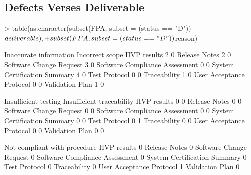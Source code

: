 \documentclass{article}
\begin{document}
\subsection{Defects Verses Deliverable}

\begin{Schunk}
\begin{Sinput}
> table(as.character(subset(FPA, subset = (status == "D"))$deliverable),
+       subset(FPA, subset = (status == "D"))$reason)
\end{Sinput}
\begin{Soutput}
                                 Inaccurate information Incorrect scope
  IIVP results                                        2               0
  Release Notes                                       2               0
  Software Change Request                             3               0
  Software Compliance Assessment                      0               0
  System Certification Summary                        4               0
  Test Protocol                                       0               0
  Traceability                                        1               0
  User Acceptance Protocol                            0               0
  Validation Plan                                     1               0
                                
                                 Insufficient testing Insufficient traceability
  IIVP results                                      0                         0
  Release Notes                                     0                         0
  Software Change Request                           0                         0
  Software Compliance Assessment                    0                         0
  System Certification Summary                      0                         0
  Test Protocol                                     0                         1
  Traceability                                      0                         0
  User Acceptance Protocol                          0                         0
  Validation Plan                                   0                         0
                                
                                 Not compliant with procedure
  IIVP results                                              0
  Release Notes                                             0
  Software Change Request                                   0
  Software Compliance Assessment                            0
  System Certification Summary                              0
  Test Protocol                                             0
  Traceability                                              0
  User Acceptance Protocol                                  1
  Validation Plan                                           0
                                

\end{Soutput}
\end{Schunk}
\end{document}
